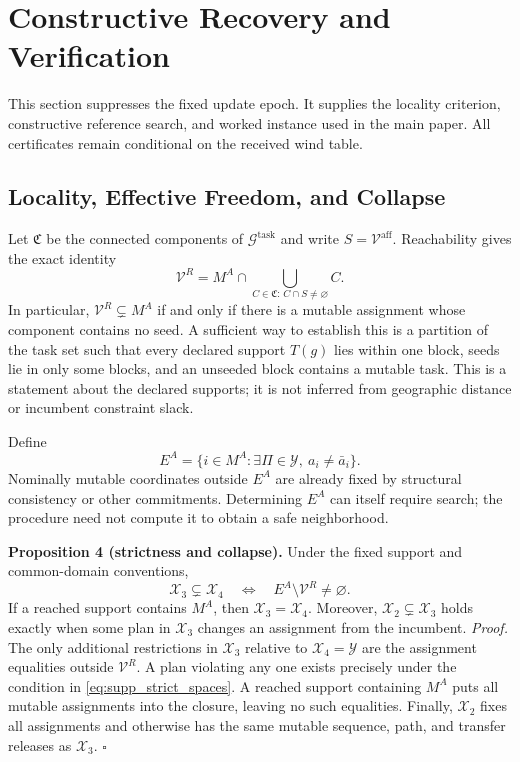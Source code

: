\section{Constructive Recovery and Verification}
\label{sec:constructive_recovery}

This section suppresses the fixed update epoch. It supplies the locality
criterion, constructive reference search, and worked instance used in the
main paper. All certificates remain conditional on the received wind table.

\subsection{Locality, Effective Freedom, and Collapse}
\label{subsec:locality_resolution}

Let $\mathfrak C$ be the connected components of
$\mathcal G^{\mathrm{task}}$ and write $S=\mathcal V^{\mathrm{aff}}$.
Reachability gives the exact identity
\begin{equation}
\mathcal V^R=M^A\cap\bigcup_{C\in\mathfrak C:\,C\cap S\ne\varnothing}C.
\label{eq:supp_component_locality}
\end{equation}
In particular, $\mathcal V^R\subsetneq M^A$ if and only if there is a
mutable assignment whose component contains no seed. A sufficient way to
establish this is a partition of the task set such that every declared
support $T(g)$ lies within one block, seeds lie in only some blocks, and
an unseeded block contains a mutable task. This is a statement about the
declared supports; it is not inferred from geographic distance or incumbent
constraint slack.

Define
\begin{equation}
E^A=\{i\in M^A:\exists\Pi\in\mathcal Y,\ a_i\ne\bar a_i\}.
\label{eq:supp_effective_assignments}
\end{equation}
Nominally mutable coordinates outside $E^A$ are already fixed by structural
consistency or other commitments. Determining $E^A$ can itself require
search; the procedure need not compute it to obtain a safe neighborhood.

\medskip
\noindent\textbf{Proposition 4 (strictness and collapse).}
Under the fixed support and common-domain conventions,
\begin{equation}
\mathcal X_3\subsetneq\mathcal X_4
\quad\Longleftrightarrow\quad E^A\setminus\mathcal V^R\ne\varnothing.
\label{eq:supp_strict_spaces}
\end{equation}
If a reached support contains $M^A$, then $\mathcal X_3=\mathcal X_4$.
Moreover, $\mathcal X_2\subsetneq\mathcal X_3$ holds exactly when some
plan in $\mathcal X_3$ changes an assignment from the incumbent.
\emph{Proof.}
The only additional restrictions in $\mathcal X_3$ relative to
$\mathcal X_4=\mathcal Y$ are the assignment equalities outside
$\mathcal V^R$. A plan violating any one exists precisely under the
condition in \eqref{eq:supp_strict_spaces}. A reached support containing
$M^A$ puts all mutable assignments into the closure, leaving no such
equalities. Finally, $\mathcal X_2$ fixes all assignments and otherwise
has the same mutable sequence, path, and transfer releases as
$\mathcal X_3$. \hfill$\square$

